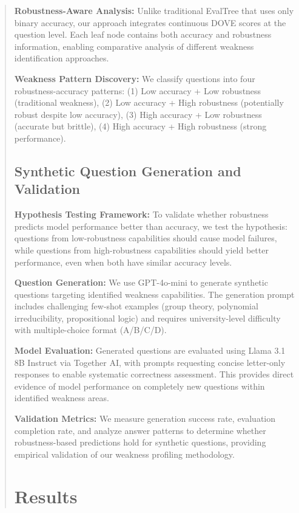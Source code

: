 \documentclass[11pt]{article}
\begin{document}
\begin{abstract}
\textbf{Robustness-Aware Analysis:} Unlike traditional EvalTree that uses only binary accuracy, our approach integrates continuous DOVE scores at the question level. Each leaf node contains both accuracy and robustness information, enabling comparative analysis of different weakness identification approaches.

\textbf{Weakness Pattern Discovery:} We classify questions into four robustness-accuracy patterns: (1) Low accuracy + Low robustness (traditional weakness), (2) Low accuracy + High robustness (potentially robust despite low accuracy), (3) High accuracy + Low robustness (accurate but brittle), (4) High accuracy + High robustness (strong performance).

\subsection{Synthetic Question Generation and Validation}

\textbf{Hypothesis Testing Framework:} To validate whether robustness predicts model performance better than accuracy, we test the hypothesis: questions from low-robustness capabilities should cause model failures, while questions from high-robustness capabilities should yield better performance, even when both have similar accuracy levels.

\textbf{Question Generation:} We use GPT-4o-mini to generate synthetic questions targeting identified weakness capabilities. The generation prompt includes challenging few-shot examples (group theory, polynomial irreducibility, propositional logic) and requires university-level difficulty with multiple-choice format (A/B/C/D).

\textbf{Model Evaluation:} Generated questions are evaluated using Llama 3.1 8B Instruct via Together AI, with prompts requesting concise letter-only responses to enable systematic correctness assessment. This provides direct evidence of model performance on completely new questions within identified weakness areas.

\textbf{Validation Metrics:} We measure generation success rate, evaluation completion rate, and analyze answer patterns to determine whether robustness-based predictions hold for synthetic questions, providing empirical validation of our weakness profiling methodology.

\section{Results}


\end{abstract}
\end{document}
